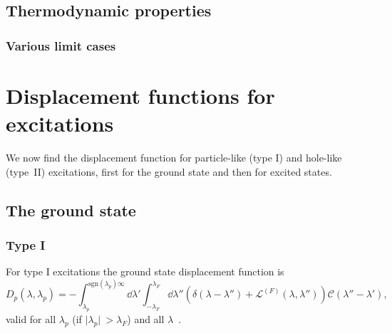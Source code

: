 \documentclass[11pt, a4paper]{report} %
\newcommand{\inversetruncc}{\mathcal{L}}
\newcommand{\kernel}{\mathcal{C}}
\begin{document}
\subsection{Thermodynamic properties}

\subsubsection{Various limit cases}


\section{Displacement functions for excitations}
We now find the displacement function for particle-like (type I) and hole-like (type~II) excitations, first for the ground state and then for excited states.

\subsection{The ground state}
\subsubsection{Type I}
For type I excitations the ground state displacement function is 
\begin{equation}\label{eq:particledisplacement}
	D_p(\lambda, \lambda_p) = - \int_{\lambda_p}^{\textrm{sgn}(\lambda_p)\infty} \dd \lambda' \int_{-\lambda_F}^{\lambda_F} \dd  \lambda'' \left(\delta(\lambda-\lambda'') + \inversetruncc^{(F)}(\lambda,\lambda'') \right)\kernel(\lambda''-\lambda'),
\end{equation}
valid for all \(\lambda_p\) (if \(\lvert \lambda_p \rvert\ > \lambda_F\)) and all \(\lambda\)~\cite{tofind}.
\end{document}
